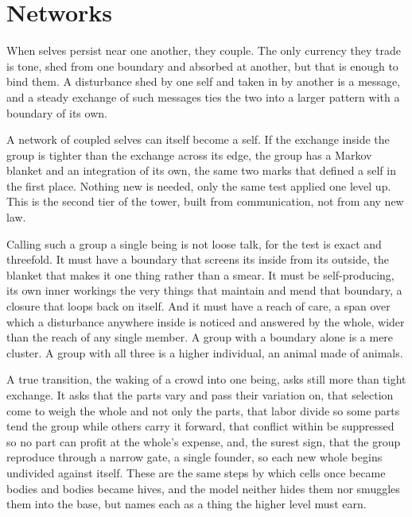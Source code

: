 \section{Networks}

When selves persist near one another, they couple. The only currency they trade is tone, shed from one boundary and absorbed at another, but that is enough to bind them. A disturbance shed by one self and taken in by another is a message, and a steady exchange of such messages ties the two into a larger pattern with a boundary of its own.

A network of coupled selves can itself become a self. If the exchange inside the group is tighter than the exchange across its edge, the group has a Markov blanket and an integration of its own, the same two marks that defined a self in the first place. Nothing new is needed, only the same test applied one level up. This is the second tier of the tower, built from communication, not from any new law.

Calling such a group a single being is not loose talk, for the test is exact and threefold. It must have a boundary that screens its inside from its outside, the blanket that makes it one thing rather than a smear. It must be self-producing, its own inner workings the very things that maintain and mend that boundary, a closure that loops back on itself. And it must have a reach of care, a span over which a disturbance anywhere inside is noticed and answered by the whole, wider than the reach of any single member. A group with a boundary alone is a mere cluster. A group with all three is a higher individual, an animal made of animals.

A true transition, the waking of a crowd into one being, asks still more than tight exchange. It asks that the parts vary and pass their variation on, that selection come to weigh the whole and not only the parts, that labor divide so some parts tend the group while others carry it forward, that conflict within be suppressed so no part can profit at the whole's expense, and, the surest sign, that the group reproduce through a narrow gate, a single founder, so each new whole begins undivided against itself. These are the same steps by which cells once became bodies and bodies became hives, and the model neither hides them nor smuggles them into the base, but names each as a thing the higher level must earn.

